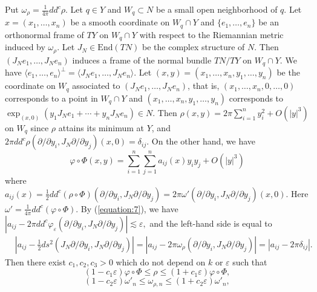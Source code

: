 \documentclass[12pt,oneside]{amsart}
\theoremstyle{plain}
\theoremstyle{definition}
\theoremstyle{remark}
\begin{document}
Put $\omega_{\rho} = \frac{1}{4\pi}dd^c \rho$.  
Let $q \in Y$ and $W_{q} \subset N$ be a small open neighborhood of $q$.  
Let $x = (x_{1}, \ldots, x_{n})$ be a smooth coordinate on $W_{q} \cap Y$ and $\{e_{1}, \ldots, e_{n}\}$ be an orthonormal frame of $TY$ on $W_{q} \cap Y$ with respect to the Riemannian metric induced by $\omega_{\rho}$.  
Let $J_{N} \in \mathrm{End} (TN)$ be the complex structure of $N$.  
Then $(J_{N}e_{1}, \ldots, J_{N}e_{n})$ induces a frame of the normal bundle $TN/TY$ on $W_{q} \cap Y$.  
We have $\langle e_{1}, \ldots, e_{n}\rangle^{\bot} = \langle J_{N}e_{1}, \ldots, J_{N}e_{n}\rangle$.  
Let $(x, y) = (x_{1}, \ldots, x_{n}, y_{1}, \ldots, y_{n})$ be the coordinate on $W_q$ associated to $(J_{N}e_{1}, \ldots, J_{N}e_{n})$, 
that is, $(x_{1}, \ldots, x_{n}, 0, \ldots, 0)$ corresponds to a point in $W_{q} \cap Y$ and 
$(x_{1}, \ldots, x_{n}, y_{1}, \ldots, y_{n})$ corresponds to $\exp_{(x, 0)} (y_{1}J_{N}e_{1} + \cdots + y_{n}J_{N}e_{n}) \in N$.  
Then 
$
\rho (x, y) = 2\pi \sum_{i=1}^n y_{i}^2 + O(|y|^3)
$
on $W_q$ 
since $\rho$ attains its minimum at $Y$, and $2\pi dd^c \rho (\partial/\partial y_i, J_N \partial /\partial y_j)(x, 0) = \delta_{ij}$.  
On the other hand, we have 
\[
\varphi \circ \Phi (x, y) = \sum_{i=1}^{n}\sum_{j=1}^n a_{ij}(x) y_{i}y_{j} + O(|y|^3)
\]
where $a_{ij}(x) = \frac{1}{2}dd^c (\rho\circ \Phi) (\partial/\partial y_i, J_N\partial/\partial y_j) =2\pi \omega' (\partial/\partial y_{i}, J_N \partial/\partial y_{j})(x, 0)$.  
Here $\omega' = \frac{1}{4\pi}dd^c (\varphi \circ \Phi)$. 
By (\ref{equation:7}), we have 
$
|a_{ij} - 2\pi dd^c \varphi_{\varepsilon}(\partial/\partial y_{i}, J_N \partial/\partial y_{j}) | \lesssim \varepsilon, 
$
and the left-hand side is equal to 
\begin{align*}
& |a_{ij} - \frac{1}{2}ds^2(J_N\partial/\partial y_{i}, J_N \partial/\partial y_{j})| = |a_{ij}- 2\pi \omega_{\rho}(\partial/\partial y_{i}, J_N \partial/\partial y_{j})| 
= |a_{ij} -  2\pi \delta_{ij}|.  
\end{align*}
Then there exist $c_{1}, c_{2}, c_{3} > 0$ which do not depend on $k$ or $\varepsilon$ such that 
\begin{equation}\label{equation:8}
(1-c_{1}\varepsilon) \varphi \circ \Phi \leq \rho \leq (1+c_{1}\varepsilon) \varphi \circ \Phi,  
\end{equation}
\begin{equation}\label{equation:9}
(1-c_{2}\varepsilon) \omega'_{n} \leq \omega_{\rho, n} \leq (1+c_{2}\varepsilon) \omega'_{n},
\end{equation}
\end{document}
